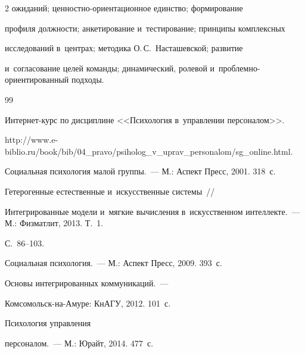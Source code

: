 \begin{multicols}{2}
ожиданий; цен\-ност\-но-ори\-ен\-та\-ци\-он\-ное единство; формирование\linebreak 

профиля долж\-ности; анкетирование и~тес\-ти\-ро\-ва\-ние; принципы комплексных 

исследований в~цент\-рах; методика О.\,С.~На\-ста\-шев\-ской; развитие 

и~согласование целей команды; динамический, \mbox{ролевой} и~проб\-лем\-но-ори\-ен\-ти\-ро\-ван\-ный подходы.

  

{\small\frenchspacing

 {%


 \begin{thebibliography}{99}


 Ин\-тер\-нет-курс по дисциплине <<Психология в~управлении  персоналом>>. 

{\sf   http://www.\linebreak \mbox{e-biblio}.ru/book/bib/04\_pravo/psiholog\_v\_uprav\_\linebreak personalom/sg\_online.html}.


 Социальная психология малой группы.~--- М.: Аспект Пресс, 2001. 318~с.


 Гетерогенные естественные и~искусственные сис\-те\-мы~// 

Интегрированные модели и~мягкие вы\-чис\-ле\-ния в~искусственном интеллекте.~--- М.: Физматлит, 2013. Т.~1. 

С.~86--103.


 Социальная психология.~--- М.: Аспект Пресс, 2009. 393~с.


 Основы интегрированных коммуникаций.~---  

Ком\-со\-мольск-на-Аму\-ре: КнАГУ, 2012. 101~с.


 Психология управления 

персоналом.~--- М.: Юрайт, 2014. 477~с.


\end{thebibliography}}}
\end{multicols}
